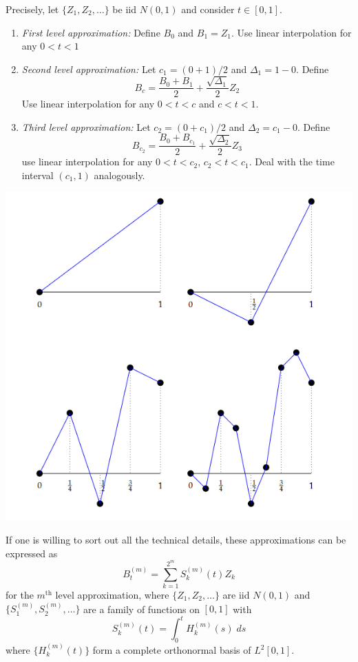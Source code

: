 \documentclass[12pt]{report}
\begin{document}
    Precisely, let $\{Z_1, Z_2, \dots\}$ be iid $N(0, 1)$ and consider $t \in [0, 1]$. 
    \begin{enumerate}
        \item \emph{First level approximation:} Define $B_0$ and $B_1 = Z_1$. Use linear interpolation for any $0  < t < 1$
        \item \emph{Second level approximation:} Let $c_1 = (0 + 1)/2$ and $\Delta_1 = 1 - 0$. Define 
        \[B_c = \frac{B_0 + B_1}{2} + \frac{\sqrt{\Delta_1}}{2} Z_2\]
        Use linear interpolation for any $0 < t < c$ and $c < t < 1$. 
        \item \emph{Third level approximation:} Let $c_2 = (0 + c_1)/2$ and $\Delta_2 = c_1 - 0$. Define
        \[B_{c_2}= \frac{B_0 + B_{c_1}}{2} + \frac{\sqrt{\Delta_2}}{2} Z_3\]
        use linear interpolation for any $0 < t < c_2$, $c_2 < t < c_1$. Deal with the time interval $(c_1, 1)$ analogously. 
    \end{enumerate}

    \begin{center}
        \includegraphics{Images/Brownian iteration.png}
    \end{center}

    If one is willing to sort out all the technical details, these approximations can be expressed as 
    \[B_t^{(m)} = \sum_{k=1}^{2^m} S_k^{(m)}(t) Z_k\] 
    for the $m^{\text{th}}$ level approximation, where $\{Z_1, Z_2, \dots\}$ are iid $N(0, 1)$ and $\{S_1^{(m)}, S_2^{(m)}, \dots\}$ are a family of functions on $[0, 1]$ with 
    \[S_k^{(m)}(t) = \int_0^t H_k^{(m)}(s)\; ds\] 
    where $\{H_k^{(m)}(t)\}$ form a complete orthonormal basis of $L^2[0, 1]$.
\end{document}
